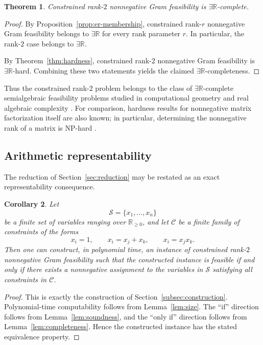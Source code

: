 \documentclass[11pt]{article}
\newtheorem{theorem}{Theorem}[section]
\newtheorem{corollary}[theorem]{Corollary}
\begin{document}
\begin{theorem}
\label{thm:classification-r2}
Constrained rank-$2$ nonnegative Gram feasibility is
$\exists\mathbb{R}$-complete.
\end{theorem}

\begin{proof}
By Proposition~\ref{prop:er-membership}, constrained rank-$r$ nonnegative
Gram feasibility belongs to $\exists\mathbb{R}$ for every rank parameter
$r$. In particular, the rank-$2$ case belongs to $\exists\mathbb{R}$.

By Theorem~\ref{thm:hardness}, constrained rank-$2$ nonnegative Gram
feasibility is $\exists\mathbb{R}$-hard. Combining these two statements yields
the claimed $\exists\mathbb{R}$-completeness.
\end{proof}

Thus the constrained rank-$2$ problem belongs to the class of
$\exists\mathbb{R}$-complete semialgebraic feasibility problems studied in
computational geometry and real algebraic complexity
\cite{schaefer2010complexity,cardinal2013survey}. For comparison, hardness
results for nonnegative matrix factorization itself are also known; in
particular, determining the nonnegative rank of a matrix is NP-hard
\cite{vavasis2009complexity}.

\subsection{Arithmetic representability}

The reduction of Section~\ref{sec:reduction} may be restated as an exact
representability consequence.

\begin{corollary}
\label{cor:arithmetic-representability}
Let
\[
\mathcal{S}=\{x_1,\dots,x_n\}
\]
be a finite set of variables ranging over \(\mathbb{R}_{\ge 0}\), and let
\(\mathcal{C}\) be a finite family of constraints of the forms
\[
x_i=1,\qquad x_i=x_j+x_k,\qquad x_i=x_jx_k.
\]
Then one can construct, in polynomial time, an instance of constrained
rank-$2$ nonnegative Gram feasibility such that the constructed instance is
feasible if and only if there exists a nonnegative assignment to the variables
in \(\mathcal{S}\) satisfying all constraints in \(\mathcal{C}\).
\end{corollary}

\begin{proof}
This is exactly the construction of
Section~\ref{subsec:construction}. Polynomial-time computability follows from
Lemma~\ref{lem:size}. The ``if'' direction follows from
Lemma~\ref{lem:soundness}, and the ``only if'' direction follows from
Lemma~\ref{lem:completeness}. Hence the constructed instance has the stated
equivalence property.
\end{proof}
\end{document}
